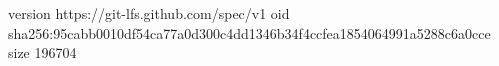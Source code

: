 version https://git-lfs.github.com/spec/v1
oid sha256:95cabb0010df54ca77a0d300c4dd1346b34f4ccfea1854064991a5288c6a0cce
size 196704
